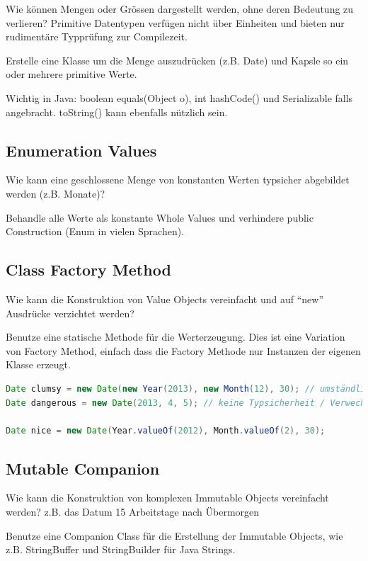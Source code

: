Wie können Mengen oder Grössen dargestellt werden, ohne deren Bedeutung zu verlieren? Primitive Datentypen verfügen nicht über Einheiten und bieten nur rudimentäre Typprüfung zur Compilezeit.

Erstelle eine Klasse um die Menge auszudrücken (z.B. Date) und Kapsle so ein oder mehrere primitive Werte.

Wichtig in Java: boolean equals(Object o), int hashCode() und Serializable falls angebracht. toString() kann ebenfalls nützlich sein.

\subsection{Enumeration Values}

Wie kann eine geschlossene Menge von konstanten Werten typsicher abgebildet werden (z.B. Monate)?

Behandle alle Werte als konstante Whole Values und verhindere public Construction (Enum in vielen Sprachen).

\subsection{Class Factory Method}

Wie kann die Konstruktion von Value Objects vereinfacht und auf ``new'' Ausdrücke verzichtet werden?

Benutze eine statische Methode für die Werterzeugung. Dies ist eine Variation von Factory Method, einfach dass die Factory Methode nur Instanzen der eigenen Klasse erzeugt.

\begin{lstlisting}[language=Java, caption={Class Factory Method}]
Date clumsy = new Date(new Year(2013), new Month(12), 30); // umständlich, keine Möglichkeit um Values wiederzuverwenden
Date dangerous = new Date(2013, 4, 5); // keine Typsicherheit / Verwechslungsgefahr

Date nice = new Date(Year.valueOf(2012), Month.valueOf(2), 30);
\end{lstlisting}

\subsection{Mutable Companion}

Wie kann die Konstruktion von komplexen Immutable Objects vereinfacht werden? z.B. das Datum 15 Arbeitstage nach Übermorgen

Benutze eine Companion Class für die Erstellung der Immutable Objects, wie z.B. StringBuffer und StringBuilder für Java Strings.


